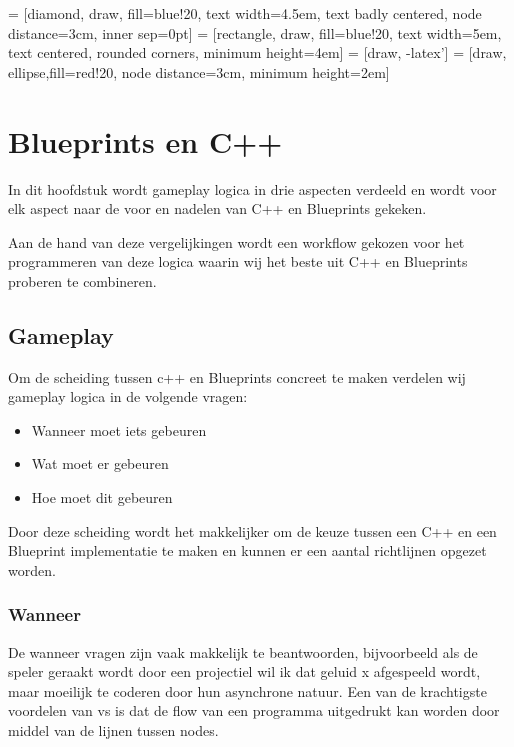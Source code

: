 \lstset {language=C++}
 = [diamond, draw, fill=blue!20, 
    text width=4.5em, text badly centered, node distance=3cm, inner sep=0pt]
 = [rectangle, draw, fill=blue!20, 
    text width=5em, text centered, rounded corners, minimum height=4em]
 = [draw, -latex']
 = [draw, ellipse,fill=red!20, node distance=3cm,
    minimum height=2em]

\chapter{Blueprints en C++}
\label{ch:BlueprintsEnCpp}

In dit hoofdstuk wordt gameplay logica in drie aspecten verdeeld en wordt voor elk aspect naar de voor en nadelen van C++ en Blueprints gekeken.

Aan de hand van deze vergelijkingen wordt een workflow gekozen voor het programmeren van deze logica waarin wij het beste uit C++ en Blueprints proberen te combineren.

\section{Gameplay}

Om de scheiding tussen c++ en Blueprints concreet te maken verdelen wij gameplay logica in de volgende vragen:

\begin{itemize}
	\item Wanneer moet iets gebeuren
	\item Wat moet er gebeuren
	\item Hoe moet dit gebeuren
\end{itemize}

Door deze scheiding wordt het makkelijker om de keuze tussen een C++ en een Blueprint implementatie te maken en kunnen er een aantal richtlijnen opgezet worden.

\subsection{Wanneer}
De wanneer vragen zijn vaak makkelijk te beantwoorden, bijvoorbeeld als de speler geraakt wordt door een projectiel wil ik dat geluid x afgespeeld wordt, maar moeilijk te coderen door hun asynchrone natuur. Een van de krachtigste voordelen van \gls{vs} is dat de flow van een programma uitgedrukt kan worden door middel van de lijnen tussen nodes. 

